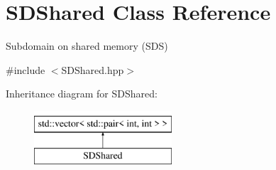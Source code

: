\hypertarget{classSDShared}{}\section{S\+D\+Shared Class Reference}
\label{classSDShared}


Subdomain on shared memory (S\+DS)  




{\ttfamily \#include $<$S\+D\+Shared.\+hpp$>$}

Inheritance diagram for S\+D\+Shared\+:\begin{figure}[H]
\begin{center}
\leavevmode
\includegraphics[height=2.000000cm]{classSDShared}
\end{center}
\end{figure}
